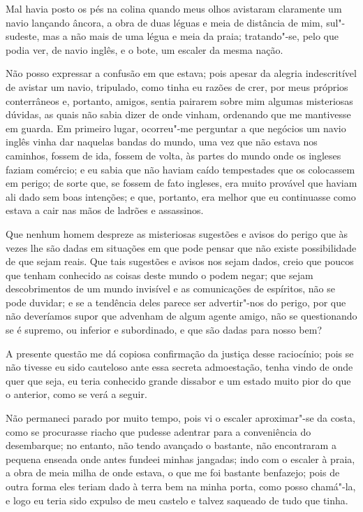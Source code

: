 Mal havia posto os pés na colina quando meus olhos avistaram claramente
um navio lançando âncora, a obra de duas léguas e meia de distância de
mim, sul"-sudeste, mas a não mais de uma légua e meia da praia;
tratando"-se, pelo que podia ver, de navio inglês, e o bote, um escaler
da mesma nação.

Não posso expressar a confusão em que estava; pois apesar da alegria
indescritível de avistar um navio, tripulado, como tinha eu razões de
crer, por meus próprios conterrâneos e, portanto, amigos, sentia
pairarem sobre mim algumas misteriosas dúvidas, as quais não sabia dizer
de onde vinham, ordenando que me mantivesse em guarda. Em primeiro
lugar, ocorreu"-me perguntar a que negócios um navio inglês vinha dar
naquelas bandas do mundo, uma vez que não estava nos caminhos, fossem de
ida, fossem de volta, às partes do mundo onde os ingleses faziam
comércio; e eu sabia que não haviam caído tempestades que os colocassem
em perigo; de sorte que, se fossem de fato ingleses, era muito provável
que haviam ali dado sem boas intenções; e que, portanto, era melhor que
eu continuasse como estava a cair nas mãos de ladrões e assassinos.

Que nenhum homem despreze as misteriosas sugestões e avisos do perigo
que às vezes lhe são dadas em situações em que pode pensar que não
existe possibilidade de que sejam reais. Que tais sugestões e avisos nos
sejam dados, creio que poucos que tenham conhecido as coisas deste mundo
o podem negar; que sejam descobrimentos de um mundo invisível e as
comunicações de espíritos, não se pode duvidar; e se a tendência deles
parece ser advertir"-nos do perigo, por que não deveríamos supor que
advenham de algum agente amigo, não se questionando se é supremo, ou
inferior e subordinado, e que são dadas para nosso bem?

A presente questão me dá copiosa confirmação da justiça desse
raciocínio; pois se não tivesse eu sido cauteloso ante essa secreta
admoestação, tenha vindo de onde quer que seja, eu teria conhecido
grande dissabor e um estado muito pior do que o anterior, como se verá a
seguir.

Não permaneci parado por muito tempo, pois vi o escaler aproximar"-se da
costa, como se procurasse riacho que pudesse adentrar para a
conveniência do desembarque; no entanto, não tendo avançado o bastante,
não encontraram a pequena enseada onde antes fundeei minhas jangadas;
indo com o escaler à praia, a obra de meia milha de onde estava, o que
me foi bastante benfazejo; pois de outra forma eles teriam dado à terra
bem na minha porta, como posso chamá"-la, e logo eu teria sido expulso de
meu castelo e talvez saqueado de tudo que tinha.

